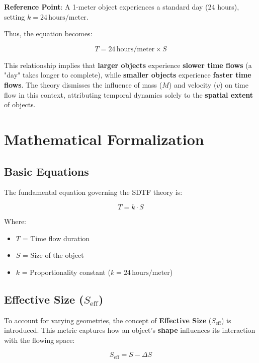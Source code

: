 \documentclass[12pt]{article}
\begin{document}
\textbf{Reference Point}: A 1-meter object experiences a standard day (24 hours), setting \( k = 24 \, \text{hours/meter} \).

Thus, the equation becomes:

\begin{equation}
    T = 24 \, \text{hours/meter} \times S
\end{equation}

This relationship implies that \textbf{larger objects} experience \textbf{slower time flows} (a "day" takes longer to complete), while \textbf{smaller objects} experience \textbf{faster time flows}. The theory dismisses the influence of mass (\( M \)) and velocity (\( v \)) on time flow in this context, attributing temporal dynamics solely to the \textbf{spatial extent} of objects.

\section{Mathematical Formalization}

\subsection{Basic Equations}

The fundamental equation governing the SDTF theory is:

\begin{equation}
    T = k \cdot S
\end{equation}

Where:
\begin{itemize}
    \item \( T \) = Time flow duration
    \item \( S \) = Size of the object
    \item \( k \) = Proportionality constant (\( k = 24 \, \text{hours/meter} \))
\end{itemize}

\subsection{Effective Size (\( S_{\text{eff}} \))}

To account for varying geometries, the concept of \textbf{Effective Size} (\( S_{\text{eff}} \)) is introduced. This metric captures how an object's \textbf{shape} influences its interaction with the flowing space:

\begin{equation}
    S_{\text{eff}} = S - \Delta S
\end{equation}
\end{document}
